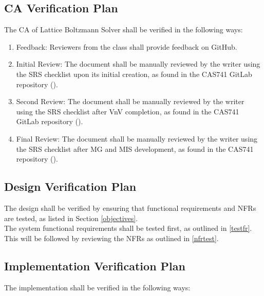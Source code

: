 \documentclass[12pt, titlepage]{article}
\newcommand{\myprogname}{Lattice Boltzmann Solver}
\begin{document}
\subsection{CA Verification Plan}

The CA of {\myprogname} shall be verified in the following ways:

\begin{enumerate}
\item Feedback: Reviewers from the class shall provide feedback on GitHub.
\item Initial Review: The document shall be manually reviewed by the writer using the SRS checklist upon its initial creation, as found in the CAS741 GitLab repository (\citet{CAS741_SRS_checklist}).
\item Second Review: The document shall be manually reviewed by the writer using the SRS checklist after VnV completion, as found in the CAS741 GitLab repository (\citet{CAS741_SRS_checklist}).
\item Final Review: The document shall be manually reviewed by the writer using the SRS checklist after MG and MIS development, as found in the CAS741 repository (\citet{CAS741_SRS_checklist}).
\end{enumerate}

\subsection{Design Verification Plan}

The design shall be verified by ensuring that functional requirements and NFRs are tested, as listed in Section \ref{objectives}.\\

\noindent The system functional requirements shall be tested first, as outlined in \ref{testfr}. This will be followed by reviewing the NFRs as outlined in \ref{nfrtest}.


\subsection{Implementation Verification Plan}
  
\noindent The implementation shall be verified in the following ways:
\end{document}

